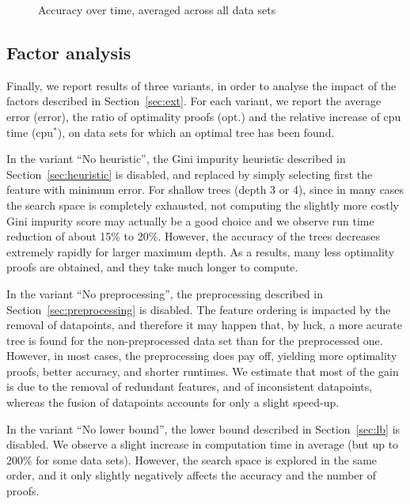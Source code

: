 \documentclass{article}
\begin{document}
\begin{figure}
	\subfloat[depth=3]{}
	\subfloat[depth=7]{}
	\subfloat[depth=10]{}
	\caption{\label{fig:cactus}Accuracy over time, averaged across all data sets}
\end{figure}


\subsection{Factor analysis}

Finally, we report results of three variants, in order to analyse the impact of the factors described in Section~\ref{sec:ext}. For each variant, we report the average error (error), the ratio of optimality proofs (opt.) and the relative increase of cpu time  (cpu$^*$), on data sets for which an optimal tree has been found.

In the variant ``No heuristic'', the Gini impurity heuristic described in Section~\ref{sec:heuristic} is disabled, and replaced by simply selecting first the feature with minimum error. For shallow trees (depth 3 or 4), since in many cases the search space is completely exhausted, not computing the slightly more costly Gini impurity score may actually be a good choice and we observe run time reduction of about 15\% to 20\%. However, the accuracy of the trees decreases extremely rapidly for larger maximum depth. As a results, many less optimality proofs are obtained, and they take much longer to compute.

In the variant ``No preprocessing'', the preprocessing described in Section~\ref{sec:preprocessing} is disabled. The feature ordering is impacted by the removal of datapoints, and therefore it may happen that, by luck, a more acurate tree is found for the non-preprocessed data set than for the preprocessed one. However, in most cases, the preprocessing does pay off, yielding more optimality proofs, better accuracy, and shorter runtimes. We estimate that most of the gain is due to the removal of redundant features, and of inconsistent datapoints, whereas the fusion of datapoints accounts for only a slight speed-up.

In the variant ``No lower bound'', the lower bound described in Section~\ref{sec:lb} is disabled. We observe a slight increase in computation time in average (but up to 200\% for some data sets). However, the search space is explored in the same order, and it only slightly negatively affects the accuracy and the number of proofs.
\end{document}

